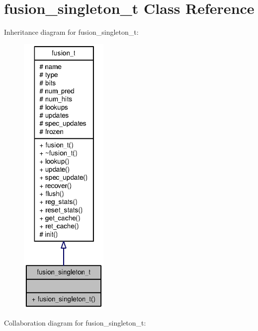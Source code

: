 \section{fusion\_\-singleton\_\-t Class Reference}
\label{classfusion__singleton__t}
Inheritance diagram for fusion\_\-singleton\_\-t:\nopagebreak
\begin{figure}[H]
\begin{center}
\leavevmode
\includegraphics[height=400pt]{classfusion__singleton__t__inherit__graph}
\end{center}
\end{figure}
Collaboration diagram for fusion\_\-singleton\_\-t:\nopagebreak
